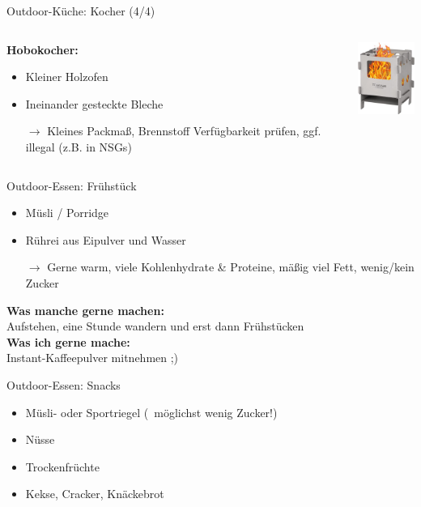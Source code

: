 \documentclass{beamer}
\newcommand{\sarrow}{\small$\rightarrow$}
\newcommand{\tipp}[2][Tipp]{\vspace{0.2cm}\textbf{#1:}\\#2}
\begin{document}
			\begin{frame}{Outdoor-Küche: Kocher (4/4)}
				\begin{columns}[c]
					\begin{column}{0.69\textwidth}
						\textbf{Hobokocher:}
						\begin{itemize}
							\item Kleiner Holzofen
							\item Ineinander gesteckte Bleche
							\item[\sarrow] Kleines Packmaß, Brennstoff Verfügbarkeit prüfen, ggf. illegal (z.B. in NSGs) 
						\end{itemize}
					\end{column}
					\begin{column}{0.29\textwidth}
						\includegraphics[width=2.35cm]{images/kocher-hobo.png}
					\end{column}
				\end{columns}
			\end{frame}
			
			\begin{frame}{Outdoor-Essen: Frühstück}
				\begin{itemize}
					\item Müsli / Porridge
					\item Rührei aus Eipulver und Wasser
					\item[\sarrow] Gerne warm, viele Kohlenhydrate \& Proteine, mäßig viel Fett, wenig/kein Zucker
				\end{itemize}\pause
				\tipp[Was manche gerne machen]{Aufstehen, eine Stunde wandern und erst dann Frühstücken}\\\pause
				\tipp[Was ich gerne mache]{Instant-Kaffeepulver mitnehmen ;)}
			\end{frame}
			
			\begin{frame}{Outdoor-Essen: Snacks}
				\begin{itemize}
					\item Müsli- oder Sportriegel (\textrightarrow\ möglichst wenig Zucker!)
					\item Nüsse
					\item Trockenfrüchte
					\item Kekse, Cracker, Knäckebrot
				\end{itemize}
			\end{frame}
			
\end{document}
